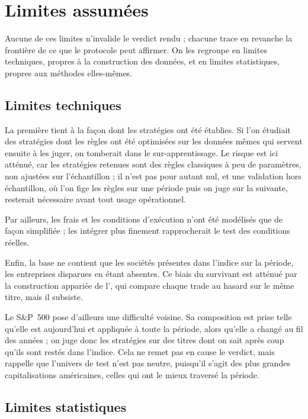 \section{Limites assumées}
\label{sec:limites}

Aucune de ces limites n'invalide le verdict rendu ; chacune trace en revanche
la frontière de ce que le protocole peut affirmer. On les regroupe en limites
techniques, propres à la construction des données, et en limites statistiques,
propres aux méthodes elles-mêmes.

\subsection*{Limites techniques}

La première tient à la façon dont les stratégies ont été établies. Si l'on
étudiait des stratégies dont les règles ont été optimisées sur les données
mêmes qui servent ensuite à les juger, on tomberait dans le sur-apprentissage.
Le risque est ici atténué, car les stratégies retenues sont des règles
classiques à peu de paramètres, non ajustées sur l'échantillon ; il n'est pas
pour autant nul, et une validation hors échantillon, où l'on fige les règles
sur une période puis on juge sur la suivante, resterait nécessaire avant tout
usage opérationnel.

Par ailleurs, les frais et les conditions d'exécution n'ont été modélisés que
de façon simplifiée ; les intégrer plus finement rapprocherait le test des
conditions réelles.

Enfin, la base ne contient que les sociétés présentes dans l'indice sur la
période, les entreprises disparues en étant absentes. Ce biais du survivant
est atténué par la construction appariée de l'\edgevar{}, qui compare chaque
trade au hasard sur le même titre, mais il subsiste.

Le S\&P~500 pose d'ailleurs une difficulté voisine. Sa composition est prise
telle qu'elle est aujourd'hui et appliquée à toute la période, alors qu'elle a
changé au fil des années ; on juge donc les stratégies sur des titres dont on
sait après coup qu'ils sont restés dans l'indice. Cela ne remet pas en cause
le verdict, mais rappelle que l'univers de test n'est pas neutre, puisqu'il
s'agit des plus grandes capitalisations américaines, celles qui ont le mieux
traversé la période.

\subsection*{Limites statistiques}

